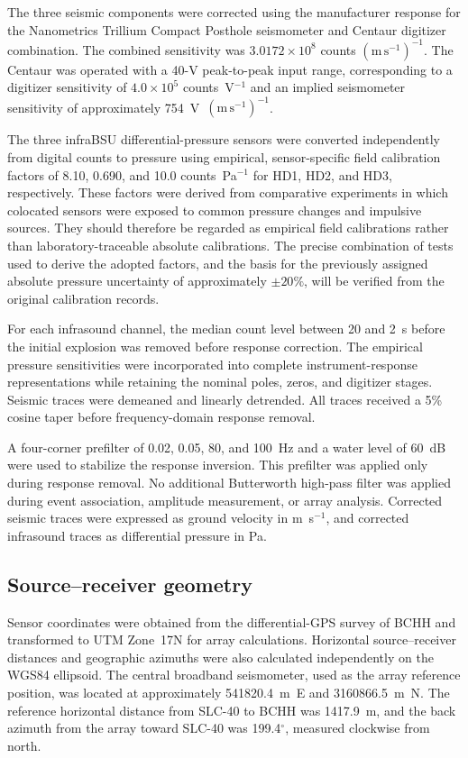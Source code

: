 \documentclass[]{seismica}
\begin{document}
The three seismic components were corrected using the manufacturer response
for the Nanometrics Trillium Compact Posthole seismometer and Centaur digitizer
combination. The combined sensitivity was
$3.0172\times10^8$ counts $(\mathrm{m\,s^{-1}})^{-1}$. The Centaur was
operated with a 40-V peak-to-peak input range, corresponding to a digitizer
sensitivity of $4.0\times10^5$ counts~V$^{-1}$ and an implied seismometer
sensitivity of approximately 754~V~$(\mathrm{m\,s^{-1}})^{-1}$.

The three infraBSU differential-pressure sensors were converted independently
from digital counts to pressure using empirical, sensor-specific field
calibration factors of 8.10, 0.690, and 10.0 counts~Pa$^{-1}$ for HD1, HD2,
and HD3, respectively. These factors were derived from comparative experiments
in which colocated sensors were exposed to common pressure changes and
impulsive sources. They should therefore be regarded as empirical field
calibrations rather than laboratory-traceable absolute calibrations. The
precise combination of tests used to derive the adopted factors, and the basis
for the previously assigned absolute pressure uncertainty of approximately
$\pm20\%$, will be verified from the original calibration records.

For each infrasound channel, the median count level between 20 and 2~s before
the initial explosion was removed before response correction. The empirical
pressure sensitivities were incorporated into complete instrument-response
representations while retaining the nominal poles, zeros, and digitizer
stages. Seismic traces were demeaned and linearly detrended. All traces received
a 5\% cosine taper before frequency-domain response removal.

A four-corner prefilter of 0.02, 0.05, 80, and 100~Hz and a water level of
60~dB were used to stabilize the response inversion. This prefilter was applied
only during response removal. No additional Butterworth high-pass filter was
applied during event association, amplitude measurement, or array analysis.
Corrected seismic traces were expressed as ground velocity in
m~s$^{-1}$, and corrected infrasound traces as differential pressure in Pa.


\subsection{Source--receiver geometry}

Sensor coordinates were obtained from the differential-GPS survey of BCHH and
transformed to UTM Zone~17N for array calculations. Horizontal
source--receiver distances and geographic azimuths were also calculated
independently on the WGS84 ellipsoid. The central broadband seismometer, used
as the array reference position, was located at approximately 541820.4~m~E and
3160866.5~m~N. The reference horizontal distance from SLC-40 to BCHH was
1417.9~m, and the back azimuth from the array toward SLC-40 was
199.4$^\circ$, measured clockwise from north.
\end{document}
